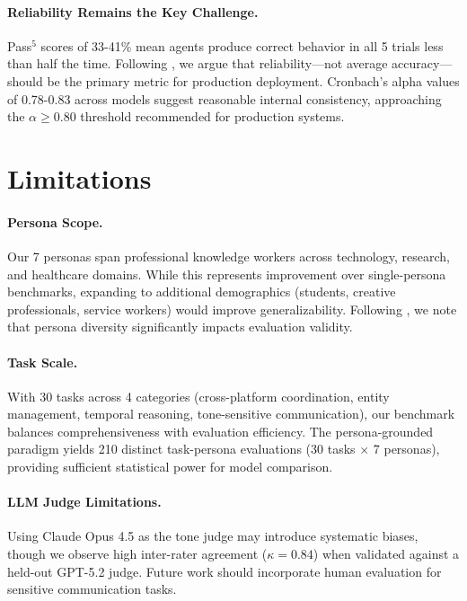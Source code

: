 \documentclass{article}
\begin{document}
\paragraph{Reliability Remains the Key Challenge.} Pass$^5$ scores of 33-41\% mean agents produce correct behavior in all 5 trials less than half the time. Following \citet{agentreliability2026}, we argue that reliability---not average accuracy---should be the primary metric for production deployment. Cronbach's alpha values of 0.78-0.83 across models suggest reasonable internal consistency, approaching the $\alpha \geq 0.80$ threshold recommended for production systems.

\section{Limitations}
\label{sec:limitations}

\paragraph{Persona Scope.} Our 7 personas span professional knowledge workers across technology, research, and healthcare domains. While this represents improvement over single-persona benchmarks, expanding to additional demographics (students, creative professionals, service workers) would improve generalizability. Following \citet{persodpo2026}, we note that persona diversity significantly impacts evaluation validity.

\paragraph{Task Scale.} With 30 tasks across 4 categories (cross-platform coordination, entity management, temporal reasoning, tone-sensitive communication), our benchmark balances comprehensiveness with evaluation efficiency. The persona-grounded paradigm yields 210 distinct task-persona evaluations (30 tasks $\times$ 7 personas), providing sufficient statistical power for model comparison.

\paragraph{LLM Judge Limitations.} Using Claude Opus 4.5 as the tone judge may introduce systematic biases, though we observe high inter-rater agreement ($\kappa = 0.84$) when validated against a held-out GPT-5.2 judge. Future work should incorporate human evaluation for sensitive communication tasks.
\end{document}

